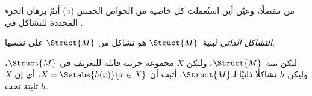 \documentclass[../../../include/open-logic-section]{subfiles}
\begin{document}
\begin{prob}
أتمّ برهان الجزء (b) من  مفصلًا،
وعيّن أين استُعملت كل خاصية من الخواص الخمس المحددة للتشاكل
في .
\end{prob}

\begin{defn}
\emph{التشاكل الذاتي} لبنية~$\Struct{M}$ هو تشاكل من
$\Struct{M}$ على نفسها.
\end{defn}

\begin{prob}
لتكن بنية~$\Struct{M}$، ولتكن $X$ مجموعة جزئية قابلة
للتعريف في $\Struct{M}$، وليكن $h$ تشاكلًا ذاتيًا لـ$\Struct{M}$.
أثبت أن $X = \Setabs{h(x)}{x \in X}$، أي إن $X$ ثابتة تحت $h$.
\end{prob}
\end{document}

